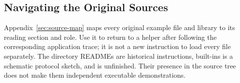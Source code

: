 

















\subsection{Navigating the Original Sources}

Appendix~\ref{sec:source-map} maps every original example file and
library to its reading section and role. Use it to return to a helper
after following the corresponding application trace; it is not a new
instruction to load every file separately. The directory READMEs are
historical instructions, built-ins is a schematic protocol sketch, and
 is unfinished. Their presence in the source tree
does not make them independent executable demonstrations.
